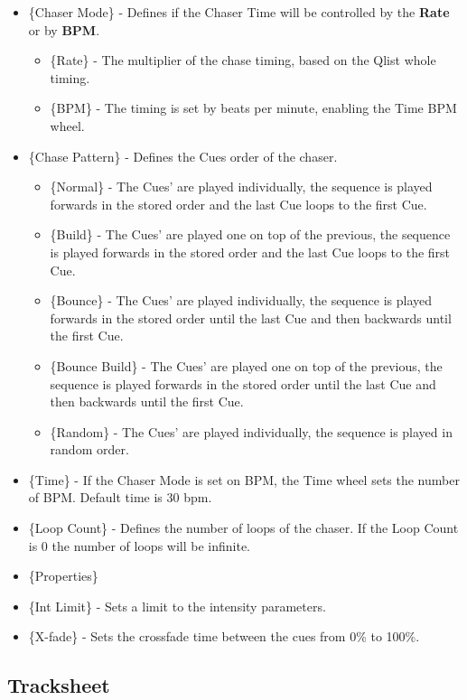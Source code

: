 \documentclass[
]{article}
\begin{document}
\begin{itemize}
\item
  \{Chaser Mode\} - Defines if the Chaser Time will be controlled by the \textbf{Rate} or by \textbf{BPM}.

  \begin{itemize}
  \item
    \{Rate\} - The multiplier of the chase timing, based on the Qlist whole timing.
  \item
    \{BPM\} - The timing is set by beats per minute, enabling the Time BPM wheel.
  \end{itemize}
\item
  \{Chase Pattern\} - Defines the Cues order of the chaser.

  \begin{itemize}
  \item
    \{Normal\} - The Cues' are played individually, the sequence is played forwards in the stored order and the last Cue loops to the first Cue.
  \item
    \{Build\} - The Cues' are played one on top of the previous, the sequence is played forwards in the stored order and the last Cue loops to the first Cue.
  \item
    \{Bounce\} - The Cues' are played individually, the sequence is played forwards in the stored order until the last Cue and then backwards until the first Cue.
  \item
    \{Bounce Build\} - The Cues' are played one on top of the previous, the sequence is played forwards in the stored order until the last Cue and then backwards until the first Cue.
  \item
    \{Random\} - The Cues' are played individually, the sequence is played in random order.
  \end{itemize}
\item
  \{Time\} - If the Chaser Mode is set on BPM, the Time wheel sets the number of BPM. Default time is 30 bpm.
\item
  \{Loop Count\} - Defines the number of loops of the chaser. If the Loop Count is 0 the number of loops will be infinite.
\item
  \{Properties\}
\item
  \{Int Limit\} - Sets a limit to the intensity parameters.
\item
  \{X-fade\} - Sets the crossfade time between the cues from 0\% to 100\%.
\end{itemize}

\hypertarget{Tracksheet-10.7}{%
\subsection{Tracksheet}\label{Tracksheet-10.7}}
\end{document}
